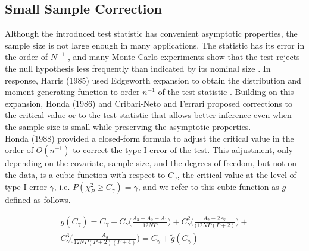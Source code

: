 \documentclass[aoas,preprint]{imsart}
\numberwithin{equation}{section}
\theoremstyle{plain}
\begin{document}


\subsection{Small Sample Correction}
Although the introduced test statistic has convenient asymptotic properties, the sample size is not large enough in many applications. The statistic has its error in the order of $N^{-1}$ \cite{harris1985asymptotic}, and many Monte Carlo experiments show that the test rejects the null hypothesis less frequently than indicated by its nominal size \cite{godfrey1978testing, griffiths1986monte, honda1988size} . In response, Harris (1985) used Edgeworth expansion to obtain the distribution and moment generating function to order $n^{-1}$ of the test statistic \cite{harris1985asymptotic}. Building on this expansion, Honda (1986) and Cribari-Neto and Ferrari proposed corrections to the critical value or to the test statistic that allows better inference even when the sample size is small while preserving the asymptotic properties. \cite{cribari1995improved, cribari2001monotonic, honda1988size}\\


Honda (1988) provided a closed-form formula to adjust the critical value in the order of $O(n^{-1})$ to correct the type I error of the test. This adjustment, only depending on the covariate, sample size, and the degrees of freedom, but not on the data, is a cubic function with respect to $C_{\gamma}$, the critical value at the level of type I error $\gamma$, i.e. $P(\chi_{P}^2 \geq C_{\gamma}) = \gamma$, and we refer to this cubic function as $g$ defined as follows.

\begin{equation}
    \begin{multlined}
g(C_{\gamma}) = C_{\gamma} + C_{\gamma}\bigg(\frac{A_3 - A_2 + A_1}{12NP}\bigg) + C_{\gamma}^2\bigg(\frac{A_2 - 2A_3}{(12NP(P+2)}\bigg) +\\
C_{\gamma}^3 \bigg(\frac{A_3}{12NP(P+2)(P+4)}\bigg) = C_{\gamma} + \tilde{g}(C_{\gamma})
\end{multlined}
\label{hondacorrection}
\end{equation}
\end{document}
